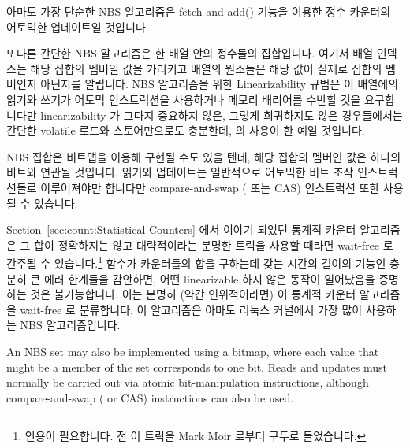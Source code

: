 아마도 가장 단순한 NBS 알고리즘은 fetch-and-add()
기능을 이용한 정수 카운터의 어토믹한 업데이트일 것입니다.

또다른 간단한 NBS 알고리즘은 한 배열 안의 정수들의 집합입니다.
여기서 배열 인덱스는 해당 집합의 멤버일 값을 가리키고 배열의 원소들은 해당 값이
실제로 집합의 멤버인지 아닌지를 알립니다.
NBS 알고리즘을 위한 Linearizability 규범은 이 배열에의 읽기와 쓰기가 어토믹
인스트럭션을 사용하거나 메모리 배리어를 수반할 것을 요구합니다만
linearizability 가 그다지 중요하지 않은, 그렇게 희귀하지도 않은 경우들에서는
간단한 volatile 로드와 스토어만으로도 충분한데,  의 사용이 한
예일 것입니다.
\iffalse

Perhaps the simplest NBS algorithm is atomic update of an integer
counter using fetch-and-add (\co{atomic_add_return()}) primitives.

Another simple NBS algorithm implements a set of integers in an array.
Here the array index indicates a value that might be a member of the set
and the array element indicates whether or not that value actually is
a set member.
The linearizability criterion for NBS algorithms requires that reads from
and updates to the array either use atomic instructions or be accompanied
by memory barriers, but in the not-uncommon case where linearizability
is not important, simple volatile loads and stores suffice, for example,
using \co{ACCESS_ONCE()}.
\fi

NBS 집합은 비트맵을 이용해 구현될 수도 있을 텐데, 해당 집합의 멤버인 값은
하나의 비트와 연관될 것입니다.
읽기와 업데이트는 일반적으로 어토믹한 비트 조작 인스트럭션들로 이루어져야만
합니다만 compare-and-swap ( 또는 CAS) 인스트럭션 또한 사용될 수
있습니다.

Section~\ref{sec:count:Statistical Counters} 에서 이야기 되었던 통계적 카운터
알고리즘은 그 합이 정확하지는 않고 대략적이라는 분명한 트릭을 사용할 때라면
wait-free 로 간주될 수 있습니다.\footnote{
	인용이 필요합니다.
	전 이 트릭을 Mark Moir 로부터 구두로 들었습니다.}
 함수가 카운터들의 합을 구하는데 갖는 시간의 길이의 기능인
충분히 큰 에러 한계들을 감안하면, 어떤 linearizable 하지 않은 동작이 일어났음을
증명하는 것은 불가능합니다.
이는 분명히 (약간 인위적이라면) 이 통계적 카운터 알고리즘을 wait-free 로
분류합니다.
이 알고리즘은 아마도 리눅스 커널에서 가장 많이 사용하는 NBS 알고리즘입니다.
\iffalse

An NBS set may also be implemented using a bitmap, where each value that
might be a member of the set corresponds to one bit.
Reads and updates must normally be carried out via atomic bit-manipulation
instructions, although compare-and-swap ( or CAS)
instructions can also be used.

